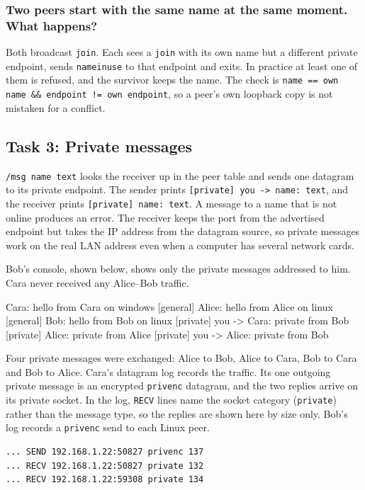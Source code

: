 \documentclass[12pt,a4paper]{article}
\begin{document}
\subsubsection{Two peers start with the same name at the same moment. What happens?}
Both broadcast \texttt{join}. Each sees a \texttt{join} with its own name but a
different private endpoint, sends \texttt{nameinuse} to that endpoint and exits.
In practice at least one of them is refused, and the survivor keeps the name. The
check is \texttt{name == own name \&\& endpoint != own endpoint}, so a peer's own
loopback copy is not mistaken for a conflict.

\subsection{Task 3: Private messages}
\label{sec:task3}
\texttt{/msg name text} looks the receiver up in the peer table and sends one
datagram to its private endpoint. The sender prints \texttt{[private] you -> name:
text}, and the receiver prints \texttt{[private] name: text}. A message to a name
that is not online produces an error. The receiver keeps the port from the
advertised endpoint but takes the IP address from the datagram source, so
private messages work on the real LAN address even when a computer has several
network cards.

Bob's console, shown below, shows only the private messages addressed
to him. Cara never received any Alice--Bob traffic.

\begin{terminalwindow}[]
[general] Cara: hello from Cara on windows
[general] Alice: hello from Alice on linux
[general] Bob: hello from Bob on linux
[private] you -> Cara: private from Bob
[private] Alice: private from Alice
[private] you -> Alice: private from Bob
\end{terminalwindow}

Four private messages were exchanged: Alice to Bob, Alice to Cara, Bob to Cara and
Bob to Alice. Cara's datagram log records the traffic. Its one outgoing private message is an
encrypted \texttt{privenc} datagram, and the two replies arrive on its private
socket. In the log, \texttt{RECV} lines name the socket category (\texttt{private})
rather than the message type, so the replies are shown here by size only. Bob's log
records a \texttt{privenc} send to each Linux peer.

\begin{lstlisting}[style=plain,caption={Excerpt from Cara's datagram log. RECV names the socket (private), not the message type.},label={lst:log}]
... SEND 192.168.1.22:50827 privenc 137
... RECV 192.168.1.22:50827 private 132
... RECV 192.168.1.22:59308 private 134
\end{lstlisting}
\end{document}
